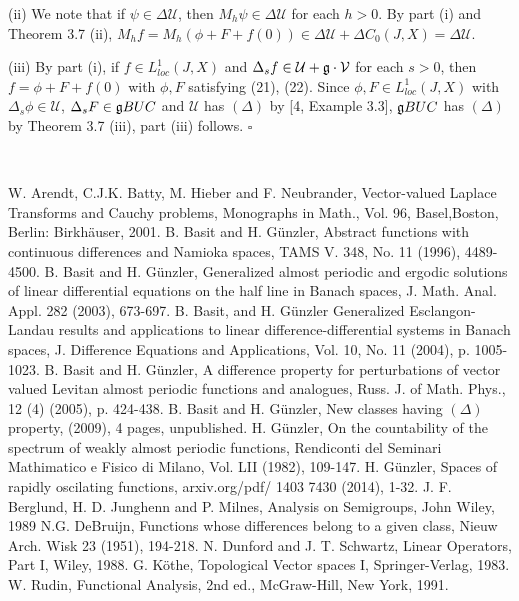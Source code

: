 \documentclass[10pt,onside,reqno]{amsart}
\newcommand{\U}{\mbox{${\mathcal U}$}}
\newcommand{\V}{\mbox{${\mathcal V}$}}
\theoremstyle{remark}
\theoremstyle{definition}
\begin{document}
(ii) We note that if $\psi \in \Delta \U$,  then  $M_h\psi \in \Delta \U$ for each $h > 0$. By part (i) and Theorem 3.7 (ii),  $M_h f=M_h (\phi +F +f(0))\in \Delta \U+ \Delta C_0 (J,X)= \Delta \U$.

(iii) By part (i), if  $f\in L^1_{loc}(J,X)$ and $\Delta_s f
\in \U+\frak{g}\cdot \V$ for each
 $s>0$, then $f=\phi + F+ f(0)$ with $\phi, F$ satisfying (21), (22).   Since $\phi, F\in L^1_{loc} (J,X)$  with  $\Delta_s\phi \in \U$, $\Delta_s F\in  \frak{g}BUC $ and $ \U$ has $(\Delta)$ by [4, Example 3.3], $ \frak{g}BUC $ has $(\Delta)$ by Theorem 3.7 (iii), part (iii) follows. $\square $



\


\begin{thebibliography}{99}


 W. Arendt, C.J.K. Batty, M. Hieber and F. Neubrander,
 Vector-valued Laplace Transforms and Cauchy problems,
Monographs in Math., Vol. 96, Basel,Boston, Berlin:
Birkh\"{a}user, 2001.
 B. Basit and H. G\"{u}nzler, Abstract functions with continuous differences and Namioka spaces, TAMS V. 348, No. 11 (1996),
4489-4500.
 B. Basit and H. G\"{u}nzler, Generalized almost
periodic and ergodic solutions of linear differential equations on
the half line in Banach spaces, J. Math. Anal.  Appl. 282 (2003),
673-697.
 B. Basit,  and H. G\"{u}nzler Generalized
Esclangon-Landau  results and applications to linear
difference-differential systems  in Banach spaces, J. Difference
Equations and Applications, Vol. 10, No. 11 (2004), p. 1005-1023.
 B. Basit and H. G\"{u}nzler, A difference
property for perturbations  of vector valued Levitan almost
periodic functions and analogues, Russ. J.  of  Math. Phys., 12
(4) (2005), p. 424-438.
 B. Basit and H. G\"{u}nzler, New classes having $(\Delta)$ property, (2009), 4 pages, unpublished.
   H. G\"{u}nzler, On the countability of the spectrum of weakly almost periodic functions, Rendiconti del Seminari Mathimatico e Fisico di Milano, Vol. LII (1982), 109-147.
   H. G\"{u}nzler, Spaces of rapidly oscilating functions, arxiv.org/pdf/ 1403 7430  (2014), 1-32.
 J. F. Berglund, H. D. Junghenn and P. Milnes,
Analysis on Semigroups, John Wiley,  1989
 N.G.
 DeBruijn, Functions whose differences belong to a given class, Nieuw Arch. Wisk 23 (1951), 194-218.
 N. Dunford and J. T. Schwartz, Linear
Operators, Part I, Wiley, 1988.
  G. K\"{o}the,  Topological Vector spaces I, Springer-Verlag, 1983.
 W. Rudin,  Functional Analysis, 2nd ed., McGraw-Hill, New York, 1991.
\end{thebibliography}
\end{document}
